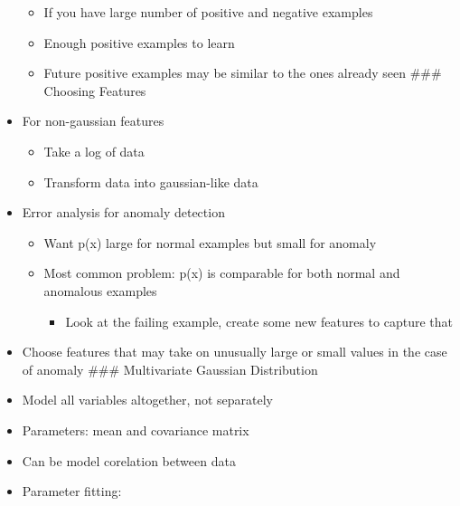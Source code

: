 \documentclass[]{article}
\providecommand{\tightlist}{%
  \setlength{\itemsep}{0pt}\setlength{\parskip}{0pt}}
\begin{document}
\begin{itemize}
  \begin{itemize}
  \tightlist
  \item
    If you have large number of positive and negative examples
  \item
    Enough positive examples to learn
  \item
    Future positive examples may be similar to the ones already seen
    \#\#\# Choosing Features
  \end{itemize}
\item
  For non-gaussian features

  \begin{itemize}
  \tightlist
  \item
    Take a log of data
  \item
    Transform data into gaussian-like data
  \end{itemize}
\item
  Error analysis for anomaly detection

  \begin{itemize}
  \tightlist
  \item
    Want p(x) large for normal examples but small for anomaly
  \item
    Most common problem: p(x) is comparable for both normal and
    anomalous examples

    \begin{itemize}
    \tightlist
    \item
      Look at the failing example, create some new features to capture
      that
    \end{itemize}
  \end{itemize}
\item
  Choose features that may take on unusually large or small values in
  the case of anomaly \#\#\# Multivariate Gaussian Distribution
\item
  Model all variables altogether, not separately
\item
  Parameters: mean and covariance matrix
\item
  Can be model corelation between data
\end{itemize}

\begin{itemize}
\tightlist
\item
  Parameter fitting:
\end{itemize}
\end{document}
